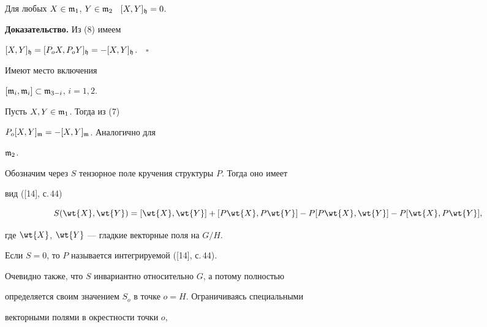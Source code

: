 




\begin{cor}


Для любых $X\in\frak{m}_1$, $Y\in\frak{m}_2$ \ $[X,Y]_{\frak{h}}=0$.


\end{cor}





{\bf Доказательство.} Из (8) имеем


$[X,Y]_{\frak{h}}=[P_oX,P_oY]_{\frak{h}}=-[X,Y]_{\frak{h}}$.$\quad\square$





\begin{cor}


Имеют место включения


$[\frak{m}_i,\frak{m}_i]\subset \frak{m}_{3-i}$, $i=1,2$.


\end{cor}





\begin{pf}


Пусть $X,Y\in \frak{m}_1$. Тогда из (7)


$P_o[X,Y]_{\frak{m}}=-[X,Y]_{\frak{m}}$. Аналогично для


$\frak{m}_2$.


\end{pf}





Обозначим через $S$ тензорное поле кручения структуры $P$. Тогда оно имеет


вид ([14], с.\,44)


$$


S(\wt{X},\wt{Y})=[\wt{X},\wt{Y}]+[P\wt{X},P\wt{Y}]-


P[P\wt{X},\wt{Y}]-P[\wt{X},P\wt{Y}],


$$


где $\wt{X}$, $\wt{Y}$ --- гладкие векторные поля на $G/H$. 


Если $S=0$, то $P$ называется интегрируемой ([14], с.\,44).


Очевидно также, что $S$ инвариантно относительно $G$, а потому полностью


определяется своим значением $S_o$ в точке $o=H$. Ограничиваясь специальными


векторными полями в окрестности точки $o$, 


